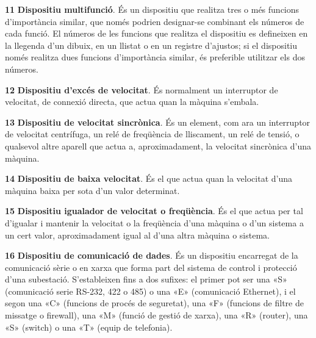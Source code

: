\begin{multicols}{2}
\begin{list}{}
\item[\textbf{11}]  
\textbf{Dispositiu multifunció}. És un dispositiu que realitza tres o més funcions d'importància similar, que només podrien designar-se combinant els números de cada funció. El números de les funcions que realitza el dispositiu es defineixen en la llegenda d'un dibuix, en un llistat o en un registre d'ajustos; si el dispositiu només realitza dues funcions d'importància similar, és preferible utilitzar els dos números.

\item[\textbf{12}]   
\textbf{Dispositiu d'excés de velocitat}. És normalment un
interruptor de velocitat, de connexió directa, que
actua quan la màquina  s'embala.

\item[\textbf{13}]   
\textbf{Dispositiu de velocitat sincrònica}. És un element, com ara un interruptor de
velocitat centrífuga, un relé de freqüència de lliscament, un relé
de tensió, o qualsevol altre aparell que actua a, aproximadament, la
velocitat sincrònica d'una màquina.


\item[\textbf{14}]   
\textbf{Dispositiu de baixa velocitat}. És el que actua quan la velocitat d'una màquina baixa per sota d'un valor determinat.

\item[\textbf{15}]  
\textbf{Dispositiu igualador de velocitat o freqüència}. És el que
actua per tal d'igualar i mantenir la velocitat o la  freqüència
d'una màquina o d'un sistema a un cert valor, aproximadament igual
al  d'una altra màquina o sistema.

\item[\textbf{16}]  
\textbf{Dispositiu de comunicació de dades}. És un dispositiu encarregat de la comunicació sèrie o en xarxa que forma part del  sistema de control i protecció d'una subestació. S'estableixen fins a dos sufixes: el primer pot ser una «S» (comunicació serie RS-232, 422 o 485) o una «E» (comunicació Ethernet), i el segon una «C» (funcions de procés de seguretat), una «F» (funcions de filtre de missatge o firewall), una «M» (funció de gestió de xarxa), una  «R» (router), una «S» (switch) o una «T» (equip de telefonia).


\end{list}
\end{multicols}
